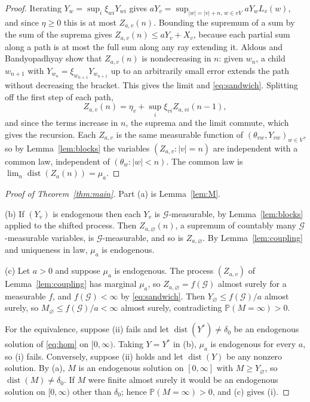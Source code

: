 \documentclass[11pt]{amsart}
\theoremstyle{remark}
\newcommand{\Ga}{\mathcal{G}}
\newcommand{\Pb}{\mathbb{P}}
\newcommand{\dist}{\operatorname{dist}}
\begin{document}
\begin{proof}
Iterating $Y_w=\sup_i\xi_{wi}Y_{wi}$ gives $aY_v=\sup_{|w|=|v|+n,\,w\in vV}aY_wL_v(w)$, and
since $\eta\ge0$ this is at most $Z_{a,v}(n)$. Bounding the supremum of a sum by the sum of
the suprema gives $Z_{a,v}(n)\le aY_v+X_v$, because each partial sum along a path is at
most the full sum along any ray extending it. Aldous and Bandyopadhyay show that
$Z_{a,v}(n)$ is nondecreasing in $n$: given $w_n$, a child $w_{n+1}$ with
$Y_{w_n}=\xi_{w_{n+1}}Y_{w_{n+1}}$ up to an arbitrarily small error extends the path without
decreasing the bracket. This gives the limit and \eqref{eq:sandwich}. Splitting off the
first step of each path,
\[
Z_{a,v}(n)=\eta_v+\sup_i\xi_{vi}Z_{a,vi}(n-1),
\]
and since the terms increase in $n$, the suprema and the limit commute, which gives the
recursion. Each $Z_{a,v}$ is the same measurable function of
$(\theta_{vw},Y_{vw})_{w\in V}$, so by Lemma~\ref{lem:blocks} the variables
$(Z_{a,v}:|v|=n)$ are independent with a common law, independent of $(\theta_w:|w|<n)$.
The common law is $\lim_n\dist(Z_a(n))=\mu_a$.
\end{proof}

\begin{proof}[Proof of Theorem~\ref{thm:main}]
Part (a) is Lemma~\ref{lem:M}.

(b) If $(Y_v)$ is endogenous then each $Y_v$ is $\Ga$-measurable, by Lemma~\ref{lem:blocks}
applied to the shifted process. Then $Z_{a,\varnothing}(n)$, a supremum of countably many
$\Ga$-measurable variables, is $\Ga$-measurable, and so is $Z_{a,\varnothing}$. By
Lemma~\ref{lem:coupling} and uniqueness in law, $\mu_a$ is endogenous.

(c) Let $a>0$ and suppose $\mu_a$ is endogenous. The process $(Z_{a,v})$ of
Lemma~\ref{lem:coupling} has marginal $\mu_a$, so $Z_{a,\varnothing}=f(\Ga)$ almost surely
for a measurable $f$, and $f(\Ga)<\infty$ by \eqref{eq:sandwich}. Then
$Y_\varnothing\le f(\Ga)/a$ almost surely, so $M_\varnothing\le f(\Ga)/a<\infty$ almost
surely, contradicting $\Pb(M=\infty)>0$.

For the equivalence, suppose (ii) fails and let $\dist(Y^*)\ne\delta_0$ be an endogenous
solution of \eqref{eq:hom} on $[0,\infty)$. Taking $Y=Y^*$ in (b), $\mu_a$ is endogenous for
every $a$, so (i) fails. Conversely, suppose (ii) holds and let $\dist(Y)$ be any nonzero
solution. By (a), $M$ is an endogenous solution on $[0,\infty]$ with $M\ge Y_\varnothing$,
so $\dist(M)\ne\delta_0$. If $M$ were finite almost surely it would be an endogenous
solution on $[0,\infty)$ other than $\delta_0$; hence $\Pb(M=\infty)>0$, and (c) gives (i).
\end{proof}
\end{document}

